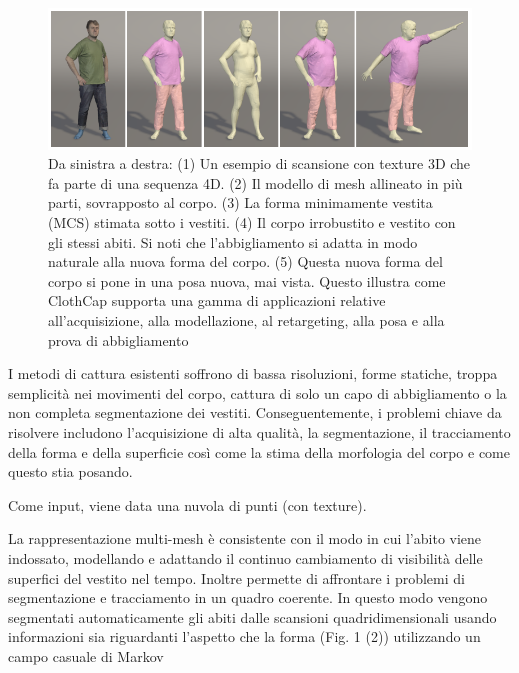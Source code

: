 \medskip

\begin{figure}[ht!]
  \centering
  \includegraphics[scale=0.5]{Images/SizerPic/Sizer6.png}
  \caption{Da sinistra a destra: (1) Un esempio di scansione con texture 3D che fa parte di una sequenza 4D. (2) Il modello di mesh allineato in più parti, sovrapposto al
corpo. (3) La forma minimamente vestita (MCS) stimata sotto i vestiti. (4) Il corpo irrobustito e vestito con gli stessi abiti. Si noti che l'abbigliamento
si adatta in modo naturale alla nuova forma del corpo. (5) Questa nuova forma del corpo si pone in una posa nuova, mai vista. Questo illustra come ClothCap supporta una gamma di
applicazioni relative all'acquisizione, alla modellazione, al retargeting, alla posa e alla prova di abbigliamento}
    \label{fig:Sizer6}
\end{figure}

\medskip

I metodi di cattura esistenti soffrono di bassa risoluzioni, forme statiche, troppa semplicità nei movimenti del corpo, cattura di solo un capo di abbigliamento o la non completa segmentazione dei vestiti.
Conseguentemente, i problemi chiave da risolvere includono l’acquisizione di alta qualità, la segmentazione, il tracciamento della forma e della superficie così come la stima della morfologia del corpo e come questo stia posando.

\medskip

Come input, viene data una nuvola di punti (con texture).

\medskip

La rappresentazione multi-mesh è consistente con il modo in cui l’abito viene indossato, modellando e adattando il continuo cambiamento di visibilità delle superfici del vestito nel tempo.
Inoltre permette di affrontare i problemi di segmentazione e tracciamento in un quadro coerente. In questo modo vengono segmentati automaticamente gli abiti dalle scansioni quadridimensionali usando informazioni sia riguardanti l’aspetto che la forma (Fig. 1 (2)) utilizzando un campo casuale di Markov 

